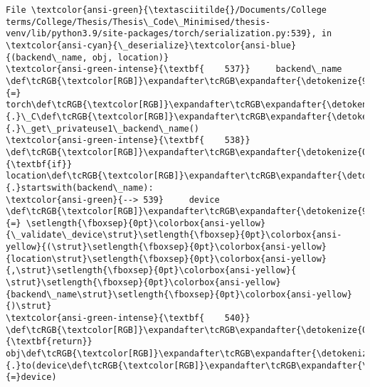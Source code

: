 \documentclass[11pt]{article}
\begin{document}
\begin{Verbatim}[commandchars=\\\{\}, frame=single, framerule=2mm, rulecolor=\color{outerrorbackground}]
File \textcolor{ansi-green}{\textasciitilde{}/Documents/College terms/College/Thesis/Thesis\_Code\_Minimised/thesis-venv/lib/python3.9/site-packages/torch/serialization.py:539}, in \textcolor{ansi-cyan}{\_deserialize}\textcolor{ansi-blue}{(backend\_name, obj, location)}
\textcolor{ansi-green-intense}{\textbf{    537}}     backend\_name \def\tcRGB{\textcolor[RGB]}\expandafter\tcRGB\expandafter{\detokenize{98,98,98}}{=} torch\def\tcRGB{\textcolor[RGB]}\expandafter\tcRGB\expandafter{\detokenize{98,98,98}}{.}\_C\def\tcRGB{\textcolor[RGB]}\expandafter\tcRGB\expandafter{\detokenize{98,98,98}}{.}\_get\_privateuse1\_backend\_name()
\textcolor{ansi-green-intense}{\textbf{    538}} \def\tcRGB{\textcolor[RGB]}\expandafter\tcRGB\expandafter{\detokenize{0,135,0}}{\textbf{if}} location\def\tcRGB{\textcolor[RGB]}\expandafter\tcRGB\expandafter{\detokenize{98,98,98}}{.}startswith(backend\_name):
\textcolor{ansi-green}{--> 539}     device \def\tcRGB{\textcolor[RGB]}\expandafter\tcRGB\expandafter{\detokenize{98,98,98}}{=} \setlength{\fboxsep}{0pt}\colorbox{ansi-yellow}{\_validate\_device\strut}\setlength{\fboxsep}{0pt}\colorbox{ansi-yellow}{(\strut}\setlength{\fboxsep}{0pt}\colorbox{ansi-yellow}{location\strut}\setlength{\fboxsep}{0pt}\colorbox{ansi-yellow}{,\strut}\setlength{\fboxsep}{0pt}\colorbox{ansi-yellow}{ \strut}\setlength{\fboxsep}{0pt}\colorbox{ansi-yellow}{backend\_name\strut}\setlength{\fboxsep}{0pt}\colorbox{ansi-yellow}{)\strut}
\textcolor{ansi-green-intense}{\textbf{    540}}     \def\tcRGB{\textcolor[RGB]}\expandafter\tcRGB\expandafter{\detokenize{0,135,0}}{\textbf{return}} obj\def\tcRGB{\textcolor[RGB]}\expandafter\tcRGB\expandafter{\detokenize{98,98,98}}{.}to(device\def\tcRGB{\textcolor[RGB]}\expandafter\tcRGB\expandafter{\detokenize{98,98,98}}{=}device)


\end{Verbatim}
\end{document}
